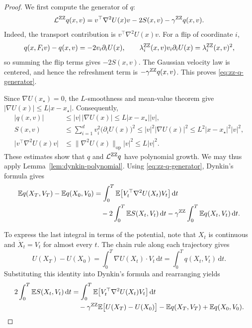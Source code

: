 \documentclass{amsart}
\theoremstyle{plain}
\theoremstyle{definition}
\theoremstyle{remark}
\newcommand{\ud}{\,\mathrm{d}}
\newcommand{\EE}{\mathbb{E}}
\newcommand{\abs}[1]{\lvert#1\rvert}
\newcommand{\E}{\EE}
\newcommand{\1}{\mathbf 1}
\newcommand{\dd}{\ud}
\newcommand{\zz}{{\rm ZZ}}
\begin{document}
\begin{proof}
We first compute the generator of $q$:
\begin{equation}\label{eq:zz-q-generator}
        \mathcal L^{\zz}q(x,v)
        =v^\top\nabla^2U(x)v-2S(x,v)-\gamma^{\zz}q(x,v).
\end{equation}
Indeed, the transport contribution is $v^\top\nabla^2U(x)v$.  For a flip of
coordinate $i$,
\[
        q(x,F_iv)-q(x,v)=-2v_i\partial_iU(x),
        \qquad
        \lambda_i^{\zz}(x,v)v_i\partial_iU(x)
        =\lambda_i^{\zz}(x,v)^2,
\]
so summing the flip terms gives $-2S(x,v)$.  The Gaussian velocity law is
centered, and hence the refreshment term is $-\gamma^{\zz}q(x,v)$.  This
proves \eqref{eq:zz-q-generator}.

Since $\nabla U(x_\star)=0$, the $L$-smoothness and mean-value theorem give
$\abs{\nabla U(x)}\le L\abs{x-x_\star}$.  Consequently,
\[
\begin{aligned}
        \abs{q(x,v)}
        &\le\abs v\,\abs{\nabla U(x)}
        \le L\abs{x-x_\star}\abs v,\\
        S(x,v)
        &\le\sum_{i=1}^d v_i^2\bigl(\partial_iU(x)\bigr)^2
        \le\abs v^2\abs{\nabla U(x)}^2
        \le L^2\abs{x-x_\star}^2\abs v^2,\\
        \abs{v^\top\nabla^2U(x)v}
        &\le\|\nabla^2U(x)\|_{\mathrm{op}}\abs v^2
        \le L\abs v^2.
\end{aligned}
\]
These estimates show that $q$ and $\mathcal L^{\zz}q$ have polynomial growth.
We may thus
apply Lemma~\ref{lem:dynkin-polynomial}.  Using
\eqref{eq:zz-q-generator}, Dynkin's formula gives
\[
\begin{aligned}
        \E q(X_T,V_T)-\E q(X_0,V_0)
        &=\int_0^T
          \E\bigl[V_t^\top\nabla^2U(X_t)V_t\bigr]\dd t\\
        &\quad-2\int_0^T\E S(X_t,V_t)\dd t
          -\gamma^{\zz}\int_0^T\E q(X_t,V_t)\dd t.
\end{aligned}
\]

To express the last integral in terms of the potential, note that $X_t$ is
continuous and $\dot X_t=V_t$ for almost every $t$.  The chain rule along
each trajectory gives
\[
        U(X_T)-U(X_0)
        =\int_0^T\nabla U(X_t)\cdot V_t\dd t
        =\int_0^Tq(X_t,V_t)\dd t.
\]
Substituting this identity into Dynkin's
formula and rearranging yields
\[
\begin{aligned}
        2\int_0^T\E S(X_t,V_t)\dd t
        &=\int_0^T\E\bigl[V_t^\top\nabla^2U(X_t)V_t\bigr]\dd t \\
        &\quad-\gamma^{\zz}\E\bigl[U(X_T)-U(X_0)\bigr]
              -\E q(X_T,V_T)+\E q(X_0,V_0).
\end{aligned}
\]


\end{proof}
\end{document}
